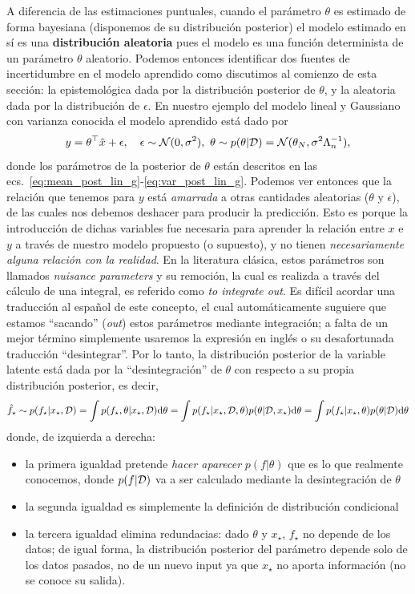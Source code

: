 A diferencia de las estimaciones puntuales, cuando el parámetro $\theta$ es estimado de forma bayesiana (disponemos de su distribución posterior) el modelo estimado en sí es una \textbf{distribución aleatoria} pues el modelo es una función determinista de un parámetro $\theta$ aleatorio. Podemos entonces identificar dos fuentes de incertidumbre en el modelo aprendido como discutimos al comienzo de esta sección: la epistemológica dada por la distribución posterior de $\theta$, y la aleatoria dada por la distribución de $\epsilon$. En nuestro ejemplo del modelo lineal y Gaussiano con varianza conocida el modelo aprendido está dado por
\begin{equation}
		 y = \theta^\top \tilde{x} + \epsilon, \quad \epsilon \sim \cN(0,\sigma^2),\ \theta \sim p(\theta|\datos) = \cN(\theta_N,\sigma^2\Lambda_n^{-1}),
\end{equation}
donde los parámetros de la posterior de $\theta$ están descritos en las ecs.~\eqref{eq:mean_post_lin_g}-\eqref{eq:var_post_lin_g}. Podemos ver entonces que la relación que tenemos para $y$ está \emph{amarrada} a otras cantidades aleatorias ($\theta$ y $\epsilon$), de las cuales nos debemos deshacer para producir la predicción. Esto es porque la introducción de dichas variables fue necesaria para aprender la relación entre $x$ e $y$ a través de nuestro modelo propuesto (o supuesto), y no tienen \emph{necesariamente alguna relación con la realidad}. En la literatura clásica, estos parámetros son llamados \emph{nuisance parameters} y su remoción, la cual es realizda a través del cálculo de una integral, es referido como \emph{to integrate out}. Es difícil acordar una traducción al español de este concepto, el cual automáticamente suguiere que estamos ``sacando'' (\emph{out}) estos parámetros mediante integración; a falta de un mejor término simplemente usaremos la expresión en inglés o su desafortunada traducción ``desintegrar''. Por lo tanto, la distribución posterior de la variable latente  está dada por la ``desintegración'' de $\theta$  con respecto a su propia distribución posterior, es decir,
\begin{equation}
	\hat f_\star \sim p(f_\star|x_\star,{\mathcal D}) = \int p(f_\star, \theta|x_\star,{\mathcal D}){\text d}\theta = \int p(f_\star|x_\star, {\mathcal D}, \theta)p( \theta|{\mathcal D},x_\star){\text d}\theta= \int p(f_\star|x_\star, \theta)p( \theta|{\mathcal D}){\text d}\theta\label{eq:integrate_out_pred}
\end{equation}
donde, de izquierda a derecha: 
\begin{itemize}
	\item la primera igualdad pretende \emph{hacer aparecer} $p(f|\theta)$ que es lo que realmente conocemos, donde $p(f|{\mathcal D})$ va a ser calculado mediante la desintegración de $\theta$
	\item la segunda igualdad es simplemente la definición de distribución condicional
	\item la tercera igualdad elimina redundacias: dado $\theta$ y $x_\star$, $f_\star$ no depende de los datos; de igual forma, la distribución posterior del parámetro depende solo de los datos pasados, no de un nuevo input ya que $x_\star$ no aporta información (no se conoce su salida).
\end{itemize}
